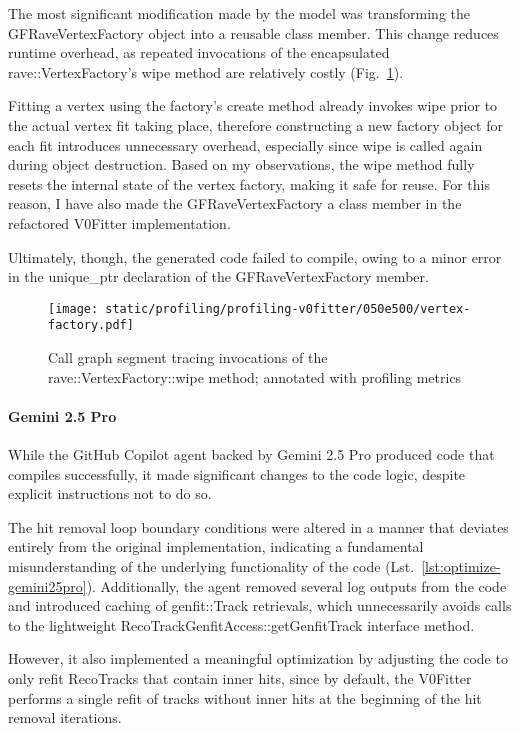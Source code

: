 The most significant modification made by the model was transforming the GFRaveVertexFactory object into a reusable class member.
This change reduces runtime overhead, as repeated invocations of the encapsulated rave::VertexFactory's wipe method are relatively costly (Fig.\ \ref{fig:vertex-factory}).

Fitting a vertex using the factory's create method already invokes wipe prior to the actual vertex fit taking place, therefore constructing a new factory object for each fit introduces unnecessary overhead, especially since wipe is called again during object destruction.
Based on my observations, the wipe method fully resets the internal state of the vertex factory, making it safe for reuse.
For this reason, I have also made the GFRaveVertexFactory a class member in the refactored V0Fitter implementation.

Ultimately, though, the generated code failed to compile, owing to a minor error in the unique\_ptr declaration of the GFRaveVertexFactory member.

\begin{figure}[H]
  \centering
  \texttt{[image: static/profiling/profiling-v0fitter/050e500/vertex-factory.pdf]}
  \caption{Call graph segment tracing invocations of the rave::VertexFactory::wipe method; annotated with profiling metrics}\label{fig:vertex-factory}
\end{figure}

\paragraph{Gemini 2.5 Pro}
While the GitHub Copilot agent backed by Gemini 2.5 Pro produced code that compiles successfully, it made significant changes to the code logic, despite explicit instructions not to do so.

The hit removal loop boundary conditions were altered in a manner that deviates entirely from the original implementation, indicating a fundamental misunderstanding of the underlying functionality of the code (Lst.\ \ref{lst:optimize-gemini25pro}).
Additionally, the agent removed several log outputs from the code and introduced caching of genfit::Track retrievals, which unnecessarily avoids calls to the lightweight RecoTrackGenfitAccess::getGenfitTrack interface method.

However, it also implemented a meaningful optimization by adjusting the code to only refit RecoTracks that contain inner hits, since by default, the V0Fitter performs a single refit of tracks without inner hits at the beginning of the hit removal iterations.

